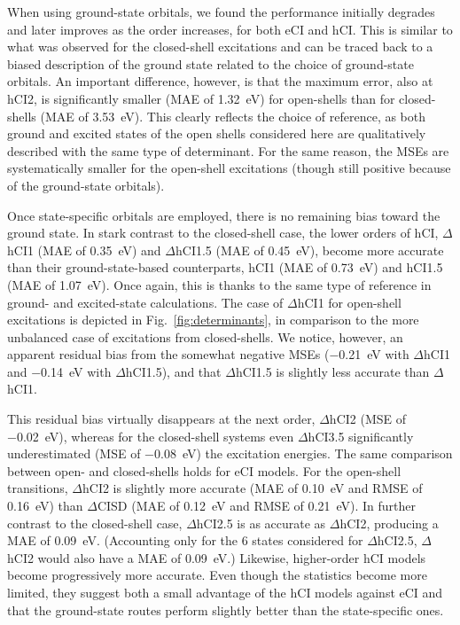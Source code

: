 \documentclass[aip,jcp,reprint,noshowkeys,superscriptaddress]{revtex4-1}
\begin{document}
When using ground-state orbitals, we found the performance initially degrades and later improves as the order increases, for both eCI and hCI.
This is similar to what was observed for the closed-shell excitations
and can be traced back to a biased description of the ground state related to the choice of ground-state orbitals.
An important difference, however, is that the maximum error, also at hCI2, is significantly smaller (MAE of \SI{1.32}{\eV}) for open-shells
than for closed-shells (MAE of \SI{3.53}{\eV}).
This clearly reflects the choice of reference, as both ground and excited states of the open shells considered here are qualitatively described with the same type of determinant.
For the same reason, the MSEs are systematically smaller for the open-shell excitations (though still positive because of the ground-state orbitals).

Once state-specific orbitals are employed, there is no remaining bias toward the ground state.
In stark contrast to the closed-shell case, the lower orders of hCI, $\Delta$hCI1 (MAE of \SI{0.35}{\eV}) and $\Delta$hCI1.5 (MAE of \SI{0.45}{\eV}),
become more accurate than their ground-state-based counterparts, hCI1 (MAE of \SI{0.73}{\eV}) and hCI1.5 (MAE of \SI{1.07}{\eV}).
Once again, this is thanks to the same type of reference in ground- and excited-state calculations.
The case of $\Delta$hCI1 for open-shell excitations is depicted in Fig.~\ref{fig:determinants}, in comparison to the more unbalanced case of excitations from closed-shells.
We notice, however, an apparent residual bias from the somewhat negative MSEs (\SI{-0.21}{\eV} with $\Delta$hCI1 and \SI{-0.14}{\eV} with $\Delta$hCI1.5),
and that $\Delta$hCI1.5 is slightly less accurate than $\Delta$hCI1.

This residual bias virtually disappears at the next order, $\Delta$hCI2 (MSE of \SI{-0.02}{\eV}),
whereas for the closed-shell systems even $\Delta$hCI3.5 significantly underestimated (MSE of \SI{-0.08}{\eV}) the excitation energies.
The same comparison between open- and closed-shells holds for eCI models.
For the open-shell transitions, $\Delta$hCI2 is slightly more accurate (MAE of \SI{0.10}{\eV} and RMSE of \SI{0.16}{\eV}) than $\Delta$CISD (MAE of \SI{0.12}{\eV} and RMSE of \SI{0.21}{\eV}).
In further contrast to the closed-shell case,
$\Delta$hCI2.5 is as accurate as $\Delta$hCI2, producing a MAE of \SI{0.09}{\eV}.
(Accounting only for the 6 states considered for $\Delta$hCI2.5, $\Delta$hCI2 would also have a MAE of \SI{0.09}{\eV}.)
Likewise, higher-order hCI models become progressively more accurate.
Even though the statistics become more limited,
they suggest both a small advantage of the hCI models against eCI
and that the ground-state routes perform slightly better than the state-specific ones.
\end{document}

